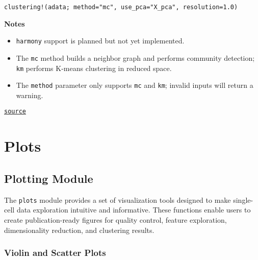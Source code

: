 \documentclass[oneside]{memoir}
\begin{document}
\begin{adjustwidth}{2em}{0pt}
\begin{verbatim}
clustering!(adata; method="mc", use_pca="X_pca", resolution=1.0)
\end{verbatim}

\textbf{Notes}

\begin{itemize}
\item \texttt{{\textquotedbl}harmony{\textquotedbl}} support is planned but not yet implemented.


\item The \texttt{{\textquotedbl}mc{\textquotedbl}} method builds a neighbor graph and performs community detection; \texttt{{\textquotedbl}km{\textquotedbl}} performs K-means clustering in reduced space.


\item The \texttt{method} parameter only supports \texttt{{\textquotedbl}mc{\textquotedbl}} and \texttt{{\textquotedbl}km{\textquotedbl}}; invalid inputs will return a warning.

\end{itemize}


\href{https://github.com/zehua0417/Juscan.jl/blob/393ad1b827b678ea98a738f92af658ee9ed9a403/src/tools/cluster.jl#L20-L60}{\texttt{source}}


\end{adjustwidth}

\chapter{Plots}


\section{Plotting Module}



\label{16924792065562968585}{}


The \texttt{plots} module provides a set of visualization tools designed to make single-cell data exploration intuitive and informative. These functions enable users to create publication-ready figures for quality control, feature exploration, dimensionality reduction, and clustering results.



\subsection{Violin and Scatter Plots}



\label{5762333281509081466}{}
\end{document}
